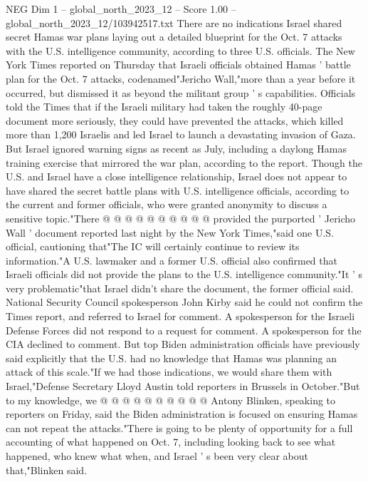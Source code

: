 \begin{textsample}{NEG Dim 1 – global\_north\_2023\_12 – Score 1.00 – global\_north\_2023\_12/103942517.txt}  \label{ex:f1_neg_360}
There are no indications Israel shared secret Hamas war plans laying out a detailed blueprint for the Oct. 7 attacks with the U.S. intelligence community, according to three U.S. officials.
The New York Times reported on Thursday that Israeli officials obtained Hamas ' battle plan for the Oct. 7 attacks, codenamed"Jericho Wall,"more than a year before it occurred, but dismissed it as beyond the militant group ' s capabilities.
Officials told the Times that if the Israeli military had taken the roughly 40-page document more seriously, they could have prevented the attacks, which killed more than 1,200 Israelis and led Israel to launch a devastating invasion of Gaza.
But Israel ignored warning signs as recent as July, including a daylong Hamas training exercise that mirrored the war plan, according to the report.
Though the U.S. and Israel have a close intelligence relationship, Israel does not appear to have shared the secret battle plans with U.S. intelligence officials, according to the current and former officials, who were granted anonymity to discuss a sensitive topic."There @ @ @ @ @ @ @ @ @ @ provided the purported ' Jericho Wall ' document reported last night by the New York Times,"said one U.S. official, cautioning that"The IC will certainly continue to review its information."A U.S. lawmaker and a former U.S. official also confirmed that Israeli officials did not provide the plans to the U.S. intelligence community."It ' s very problematic"that Israel didn't share the document, the former official said.
National Security Council spokesperson John Kirby said he could not confirm the Times report, and referred to Israel for comment.
A spokesperson for the Israeli Defense Forces did not respond to a request for comment.
A spokesperson for the CIA declined to comment.
But top Biden administration officials have previously said explicitly that the U.S. had no knowledge that Hamas was planning an attack of this scale."If we had those indications, we would share them with Israel,"Defense Secretary Lloyd Austin told reporters in Brussels in October."But to my knowledge, we @ @ @ @ @ @ @ @ @ @ Antony Blinken, speaking to reporters on Friday, said the Biden administration is focused on ensuring Hamas can not repeat the attacks."There is going to be plenty of opportunity for a full accounting of what happened on Oct. 7, including looking back to see what happened, who knew what when, and Israel ' s been very clear about that,"Blinken said.

\end{textsample}
